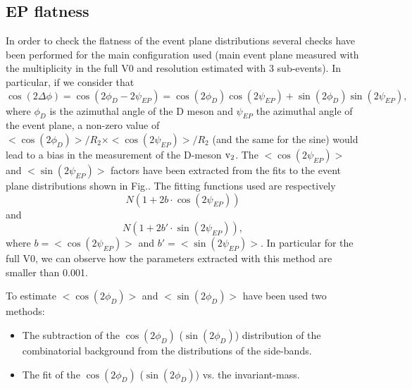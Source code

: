 \subsection{EP flatness}
\label{sec:EPflat}
In order to check the flatness of the event plane 
distributions several checks have been performed 
for the main configuration used (main event plane 
measured with the multiplicity in the full V0 and
 resolution estimated with 3 sub-events). In particular, if we consider that
\begin{equation}
\cos(2\Delta\phi) = \cos(2\phi_D-2\psi_{EP}) = \cos(2\phi_D)\cos(2\psi_{EP})+\sin(2\phi_D)\sin(2\psi_{EP}),
\end{equation}
where $\phi_D$ is the azimuthal angle of the D meson 
and $\psi_{EP}$ the azimuthal angle of the event plane, 
a non-zero value of 
$< \cos(2\phi_D) >/R_2 \times < \cos(2\psi_{EP}) >/R_2$ 
(and the same for the sine) would lead to a bias in the 
measurement of the D-meson $\rm v_2$. The  
$< \cos(2\psi_{EP}) >$ and $< \sin(2\psi_{EP}) >$ factors 
have been extracted from the fits to the event plane 
distributions shown in Fig.. The fitting functions used are respectively 
\begin{equation}
N(1+2b\cdot \cos(2\psi_{EP}))
\end{equation}
and 
\begin{equation}
N(1+2b'\cdot \sin(2\psi_{EP})),
\end{equation}
where $b = < \cos(2\psi_{EP}) >$ and $b' = < \sin(2\psi_{EP}) >$.
In particular for the full V0, we can observe how the parameters 
extracted with this method are smaller than 0.001.


To estimate $< \cos(2\phi_D) >$ and $< \sin(2\phi_D) >$ 
have been used two methods:
\begin{itemize}
\item The subtraction of the $\cos(2\phi_D)$ ($\sin(2\phi_D)$) 
distribution of the combinatorial background from the distributions of the side-bands.
\item The fit of the $\cos(2\phi_D)$ ($\sin(2\phi_D)$) vs. the invariant-mass.
\end{itemize}

